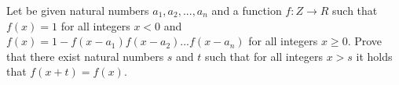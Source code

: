 Let be given natural numbers $a_1,a_2,...,a_n$ and a function $f : Z \to R$ such that $f(x) = 1$ for all integers $x < 0$ and $f(x) = 1- f(x-a_1)f(x-a_2)... f(x-a_n)$ for all integers $x \ge 0$. Prove that there exist natural numbers $s$ and $t$ such that for all integers $x > s$ it holds that $f(x+t) = f(x)$.